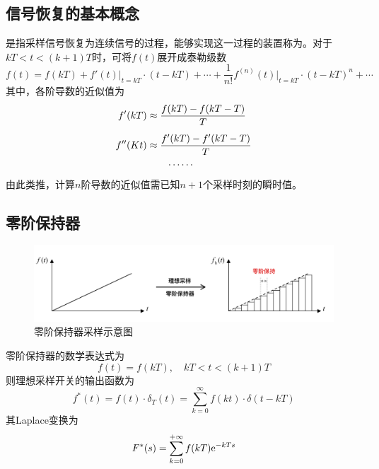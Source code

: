 \subsection{信号恢复的基本概念}
是指采样信号恢复为连续信号的过程，能够实现这一过程的装置称为。对于$kT<t<(k+1)T$时，可将$f(t)$展开成泰勒级数
\begin{equation}
	f(t) = f(kT) + f'(t)\big|_{t = kT}\cdot(t - kT) + \cdots + \dfrac{1}{n!}f^{(n)}(t)\big|_{t = kT} \cdot (t-kT)^n + \cdots
\end{equation}
其中，各阶导数的近似值为
\begin{align}
	f'(kT) &\approx \dfrac{f(kT) - f(kT - T)}{T}\\[0.5em]
	f''(Kt) & \approx \dfrac{f'(kT) - f'(kT - T)}{T}\\
	& \quad \quad \cdots \cdots \notag
\end{align}
由此类推，计算$n$阶导数的近似值需已知$n+1$个采样时刻的瞬时值。

\subsection{零阶保持器}
\begin{figure}[!htb]
	\centering
	\includegraphics[width = 0.9\linewidth]{pic/零阶保持.pdf}
	\caption{零阶保持器采样示意图}
	\label{零阶保持器采样}
\end{figure}
零阶保持器的数学表达式为
\begin{equation}
	f(t) = f(kT), \quad kT < t<(k+1)T
\end{equation}
则理想采样开关的输出函数为
\begin{equation}
	f^*(t) = f(t)\cdot \delta_T(t) = \sum_{k = 0}^{\infty} f(kt) \cdot \delta(t - kT)
\end{equation}
其Laplace变换为
\begin{equation}
	F^*(s) = \sum_{k = 0}^{+\infty} f(kT) {\rm{e}}^{- kTs}
\end{equation}


